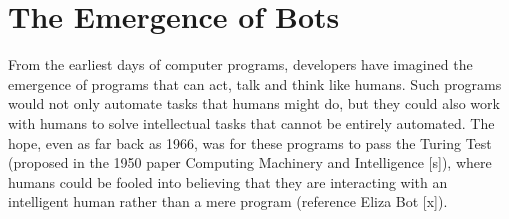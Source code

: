 \documentclass{sig-alternate}
\begin{document}
%
\author{
% 
%
\alignauthor
XXX\\
       \\
}

\date{29 Sept 2017}

\maketitle
%




\section{The Emergence of Bots} 


From the earliest days of computer programs, developers have imagined the emergence of programs that can act, talk and think like humans.
Such programs would not only automate tasks that humans might do, but they could also work with humans to solve intellectual tasks that cannot be entirely automated. 
The hope, even as far back as 1966, was for these programs to pass the Turing Test (proposed in the 1950 paper Computing Machinery and Intelligence [s]), where humans could be fooled into believing that they are interacting with an intelligent human rather than a mere program (reference Eliza Bot [x]). 
\end{document}
